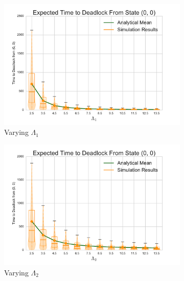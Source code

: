 \documentclass{article}
\numberwithin{equation}{section}
\begin{document}
\begin{center}
\begin{figure}[!htbp]
\begin{center}
\begin{subfigure}[b]{0.38\textwidth}
  \includegraphics[width=\textwidth]{images/varyL1}
  \caption{Varying $\Lambda_1$}
  \label{fig:timestodeadlock2_L1}
\end{subfigure}
\begin{subfigure}[b]{0.38\textwidth}
  \includegraphics[width=\textwidth]{images/varyL2}
  \caption{Varying $\Lambda_2$}
  \label{fig:timestodeadlock2_L2}
\end{subfigure}
\begin{subfigure}[b]{0.38\textwidth}

\end{subfigure}
\end{center}
\end{figure}
\end{center}
\end{document}
